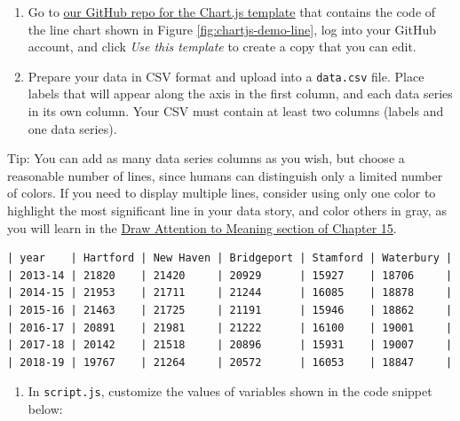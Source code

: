 \documentclass[
  english,
]{book}
\providecommand{\tightlist}{%
  \setlength{\itemsep}{0pt}\setlength{\parskip}{0pt}}
\begin{document}
\begin{enumerate}
\def\labelenumi{\arabic{enumi}.}
\item
  Go to \href{https://github.com/HandsOnDataViz/chartjs-line}{our GitHub repo for the Chart.js template} that contains the code of the line chart shown in Figure \ref{fig:chartjs-demo-line}, log into your GitHub account, and click \emph{Use this template} to create a copy that you can edit.
\item
  Prepare your data in CSV format and upload into a \texttt{data.csv} file. Place labels that will appear along the axis in the first column, and each data series in its own column. Your CSV must contain at least two columns (labels and one data series).
\end{enumerate}

Tip: You can add as many data series columns as you wish, but choose a reasonable number of lines, since humans can distinguish only a limited number of colors. If you need to display multiple lines, consider using only one color to highlight the most significant line in your data story, and color others in gray, as you will learn in the \href{draw-attention.html}{Draw Attention to Meaning section of Chapter 15}.

\begin{verbatim}
| year    | Hartford | New Haven | Bridgeport | Stamford | Waterbury |
| 2013-14 | 21820    | 21420     | 20929      | 15927    | 18706     |
| 2014-15 | 21953    | 21711     | 21244      | 16085    | 18878     |
| 2015-16 | 21463    | 21725     | 21191      | 15946    | 18862     |
| 2016-17 | 20891    | 21981     | 21222      | 16100    | 19001     |
| 2017-18 | 20142    | 21518     | 20896      | 15931    | 19007     |
| 2018-19 | 19767    | 21264     | 20572      | 16053    | 18847     |
\end{verbatim}

\begin{enumerate}
\def\labelenumi{\arabic{enumi}.}
\setcounter{enumi}{2}
\tightlist
\item
  In \texttt{script.js}, customize the values of variables shown in the code snippet below:
\end{enumerate}
\end{document}
